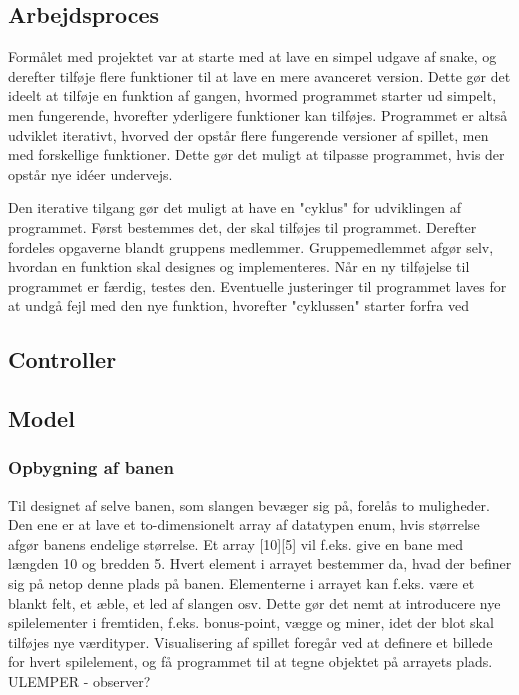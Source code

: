 \documentclass{report}
\begin{document}
\subsection{Arbejdsproces}
Formålet med projektet var at starte med at lave en simpel udgave af snake, og derefter tilføje flere funktioner til at lave en mere avanceret version. Dette gør det ideelt at tilføje en funktion af gangen, hvormed programmet starter ud simpelt, men fungerende, hvorefter yderligere funktioner kan tilføjes. Programmet er altså udviklet iterativt, hvorved der opstår flere fungerende versioner af spillet, men med forskellige funktioner. Dette gør det muligt at tilpasse programmet, hvis der opstår nye idéer undervejs. 

Den iterative tilgang gør det muligt at have en "cyklus" for udviklingen af programmet. Først bestemmes det, der skal tilføjes til programmet. Derefter fordeles opgaverne blandt gruppens medlemmer. Gruppemedlemmet afgør selv, hvordan en funktion skal designes og implementeres. Når en ny tilføjelse til programmet er færdig, testes den. Eventuelle justeringer til programmet laves for at undgå fejl med den nye funktion, hvorefter "cyklussen" starter forfra ved

\subsection{Controller}
	
\subsection{Model}

\subsubsection{Opbygning af banen}
Til designet af selve banen, som slangen bevæger sig på, forelås to muligheder. Den ene er at lave et to-dimensionelt array af datatypen enum, hvis størrelse afgør banens endelige størrelse. Et array [10][5] vil f.eks. give en bane med længden 10 og bredden 5. Hvert element i arrayet bestemmer da, hvad der befiner sig på netop denne plads på banen. Elementerne i arrayet kan f.eks. være et blankt felt, et æble, et led af slangen osv. Dette gør det nemt at introducere nye spilelementer i fremtiden, f.eks. bonus-point, vægge og miner, idet der blot skal tilføjes nye værdityper. Visualisering af spillet foregår ved at definere et billede for hvert spilelement, og få programmet til at tegne objektet på arrayets plads.
ULEMPER - observer?
\end{document}
